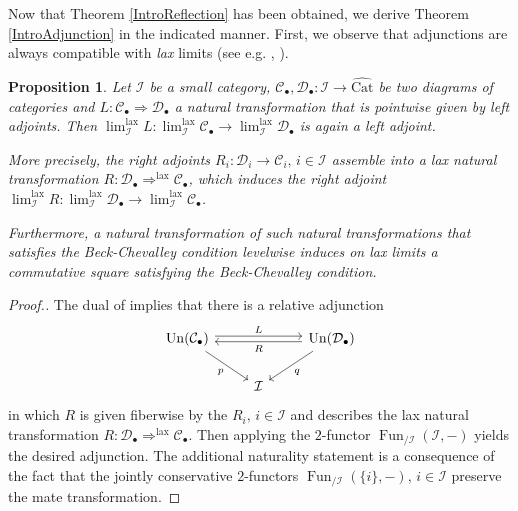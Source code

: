 \documentclass[a4paper,reqno,10pt]{amsart}
\newtheorem{proposition}[theorem]{Proposition}
\theoremstyle{definition}
\theoremstyle{remark}
\newcommand{\C}{\mathcal{C}}
\newcommand{\D}{\mathcal{D}}
\newcommand{\I}{\mathcal{I}}
\newcommand{\Fun}{\operatorname{Fun}}
\newcommand{\Un}{\mathrm{Un}}
\newcommand{\Cat}{\mathrm{Cat}}
\newcommand{\lax}{\mathrm{lax}}
\begin{document}

Now that Theorem \ref{IntroReflection} has been obtained, we derive Theorem \ref{IntroAdjunction} in the indicated manner. First, we observe that adjunctions are always compatible with \textit{lax} limits (see e.g. \cite[Proposition 5.1]{HorevYanovski}, \cite[Lemma 3.19]{Linskens}).

\begin{proposition}\label{AdjunctionOnLaxLimits}
Let $\I$ be a small category, $\C_{\bullet},\D_{\bullet}\colon\I\rightarrow\widehat{\Cat}$ be two diagrams of categories and $L\colon\C_{\bullet}\Rightarrow\D_{\bullet}$ a natural transformation that is pointwise given by left adjoints. Then $\lim^{\lax}_{\I}L\colon\lim^{\lax}_{\I}\C_{\bullet}\rightarrow\lim^{\lax}_{\I}\D_{\bullet}$ is again a left adjoint.

More precisely, the right adjoints $R_i\colon\D_i\rightarrow\C_i,\,i\in\I$ assemble into a lax natural transformation $R\colon\D_{\bullet}\Rightarrow^{\lax}\C_{\bullet}$, which induces the right adjoint $\lim^{\lax}_{\I}R\colon\lim^{\lax}_{\I}\D_{\bullet}\rightarrow\lim^{\lax}_{\I}\C_{\bullet}$.

Furthermore, a natural transformation of such natural transformations that satisfies the Beck-Chevalley condition levelwise induces on lax limits a commutative square satisfying the Beck-Chevalley condition.
\end{proposition}
\begin{proof}[Proof.]
The dual of \cite[Proposition 7.3.2.6]{HA} implies that there is a relative adjunction
\begin{equation*}
\begin{tikzcd}
\Un(\C_{\bullet})\arrow[rr,shift left=0.2em,"L"]\arrow[dr,"p"'] & & \Un(\D_{\bullet})\arrow[ll,shift left=0.2em,"R"]\arrow[dl,"q"]\\
& \I & 
\end{tikzcd}
\end{equation*}
in which $R$ is given fiberwise by the $R_i,\,i\in\I$ and describes the lax natural transformation $R\colon\D_{\bullet}\Rightarrow^{\lax}\C_{\bullet}$. Then applying the $2$-functor $\Fun_{/\I}(\I,-)$ yields the desired adjunction. The additional naturality statement is a consequence of the fact that the jointly conservative $2$-functors $\Fun_{/\I}(\{i\},-),\,i\in\I$ preserve the mate transformation.
\end{proof}
\end{document}
